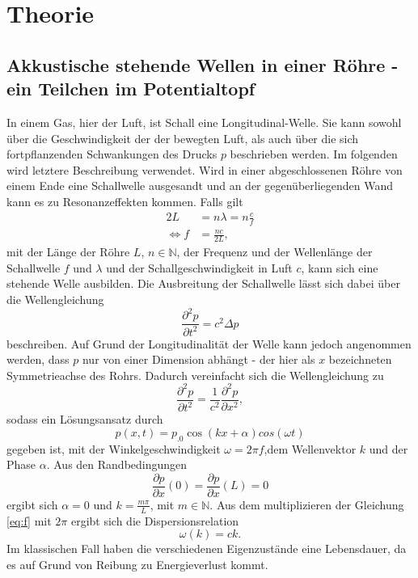 \section{Theorie}
\label{sec:Theorie}

\subsection{Akkustische stehende Wellen in einer Röhre - ein Teilchen im Potentialtopf}
In einem Gas, hier der Luft, ist Schall eine Longitudinal-Welle. Sie kann sowohl über die Geschwindigkeit der der bewegten Luft, als auch über die sich fortpflanzenden Schwankungen des Drucks $p$ beschrieben werden. Im folgenden wird letztere Beschreibung verwendet.
Wird in einer abgeschlossenen Röhre von einem Ende eine Schallwelle ausgesandt und an der gegenüberliegenden Wand kann es zu Resonanzeffekten kommen. Falls gilt
\begin{align}
2L&=n\lambda=n\frac{c}{f}\\
\Leftrightarrow f&=\frac{n c}{2L},\label{eq:f}
\end{align}
mit der Länge der Röhre $L$, $n\in\mathbb{N}$, der Frequenz und der Wellenlänge der Schallwelle $f$ und $\lambda$ und der Schallgeschwindigkeit in Luft $c$, kann sich eine stehende Welle ausbilden.
Die Ausbreitung der Schallwelle lässt sich dabei über die Wellengleichung
\begin{equation}
\frac{\partial^2 p}{\partial t^2}=c^2\Delta p\label{eq:WGL}
\end{equation}
beschreiben. Auf Grund der Longitudinalität der Welle kann jedoch angenommen werden, dass $p$ nur von einer Dimension abhängt - der hier als $x$ bezeichneten Symmetrieachse des Rohrs. Dadurch vereinfacht sich die Wellengleichung zu
\[
\frac{\partial^2 p}{\partial t^2}=\frac{1}{c^2}\frac{\partial^2 p}{\partial x^2},
\]
sodass ein Lösungsansatz durch
\[
p(x,t)=p_.0\cos(k x +\alpha)cos(\omega t)
\]
gegeben ist, mit der Winkelgeschwindigkeit $\omega=2\pi f$,dem Wellenvektor $k$ und der Phase $\alpha$. Aus den Randbedingungen 
\[
\frac{\partial p}{\partial x}(0)=\frac{\partial p}{\partial x}(L)=0
\]
ergibt sich $\alpha=0$ und $k=\frac{m\pi}{L}$, mit $m\in\mathbb{N}$.
Aus dem multiplizieren der Gleichung \eqref{eq:f} mit $2\pi$ ergibt sich die Dispersionsrelation
\begin{equation}
\omega(k)=c k\text{.}\label{eq:w_k}
\end{equation}
Im klassischen Fall haben die verschiedenen Eigenzustände eine Lebensdauer, da es auf Grund von Reibung zu Energieverlust kommt.
